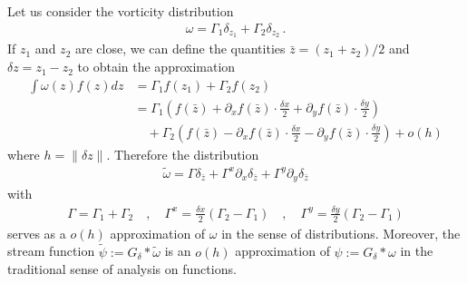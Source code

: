 \documentclass[12pt]{amsart}
\theoremstyle{remark}
\begin{document}
Let us consider the vorticity distribution
\begin{align*}
	\omega = \Gamma_1 \delta_{z_1} + \Gamma_2 \delta_{z_2}\,.
\end{align*}
If $z_1$ and $z_2$ are close, we can define the quantities $\bar{z} = (z_1+z_2)/2$ and $\delta z = z_1 - z_2 $ to obtain the approximation
\begin{align*}
	\int \omega(z) f(z)dz &= \Gamma_1 f(z_1) + \Gamma_2 f(z_2) \\
		&= \Gamma_1 \left( f(\bar{z}) + \partial_x f(\bar{z}) \cdot \frac{\delta x}{2} + \partial_y f(\bar{z}) \cdot \frac{\delta y}{2}  \right)\\
		&\quad + \Gamma_2 \left( f(\bar{z}) - \partial_x f(\bar{z}) \cdot \frac{\delta x}{2} - \partial_y f(\bar{z}) \cdot \frac{\delta y}{2}  \right) + o( h ) 
\end{align*}
where $h = \| \delta z \|$.
Therefore the distribution
\begin{align*}
	\tilde{\omega} = \Gamma \delta_{\bar{z}} + \Gamma^x \partial_x \delta_{\bar{z}} + \Gamma^y \partial_y \delta_{\bar{z}}
\end{align*}
with 
\begin{align*}
	\Gamma = \Gamma_1 + \Gamma_2 \quad,\quad \Gamma^x = \frac{\delta x}{2} (\Gamma_2 -\Gamma_1) \quad,\quad \Gamma^y = \frac{\delta y}{2} (\Gamma_2 -\Gamma_1)
\end{align*}
serves as a $o(h)$ approximation of $\omega$ in the sense of distributions.
Moreover, the stream function $\tilde{\psi} := G_\delta * \tilde{\omega}$ is an $o(h)$ approximation of $\psi := G_\delta * \omega$ in the traditional sense of analysis on functions.
\end{document}

